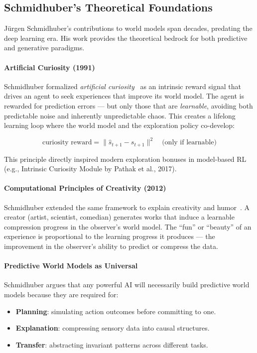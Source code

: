 \documentclass{tufte-handout}
\begin{document}
\subsection{Schmidhuber's Theoretical Foundations}

Jürgen Schmidhuber's contributions to world models span decades, predating the deep learning
era. His work provides the theoretical bedrock for both predictive and generative paradigms.

\paragraph{Artificial Curiosity (1991)}
Schmidhuber formalized \textit{artificial curiosity}~\nocite{schmidhuber1991} as an
intrinsic reward signal that drives an agent to seek experiences that improve its world model.
The agent is rewarded for prediction errors --- but only those that are \textit{learnable},
avoiding both predictable noise and inherently unpredictable chaos. This creates a lifelong
learning loop where the world model and the exploration policy co-develop:

\begin{equation}
    \text{curiosity reward} = \|\hat{s}_{t+1} - s_{t+1}\|^2 \quad \text{(only if learnable)}
    \label{eq:curiosity}
\end{equation}

This principle directly inspired modern exploration bonuses in model-based RL (e.g., Intrinsic
Curiosity Module by Pathak et al., 2017).

\paragraph{Computational Principles of Creativity (2012)}
Schmidhuber extended the same framework to explain creativity and humor~\nocite{schmidhuber2012}. A creator (artist,
scientist, comedian) generates works that induce a learnable compression progress in the
observer's world model. The ``fun'' or ``beauty'' of an experience is proportional to the
learning progress it produces --- the improvement in the observer's ability to predict or
compress the data.

\paragraph{Predictive World Models as Universal}
Schmidhuber argues that any powerful AI will necessarily build predictive world models because
they are required for:
\begin{itemize}
    \item \textbf{Planning}: simulating action outcomes before committing to one.
    \item \textbf{Explanation}: compressing sensory data into causal structures.
    \item \textbf{Transfer}: abstracting invariant patterns across different tasks.
\end{itemize}
\end{document}
